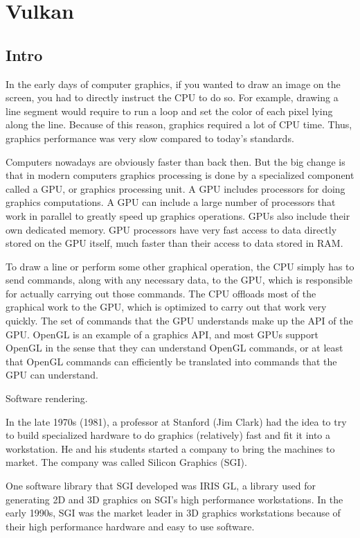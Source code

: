\chapter{Vulkan}

\section{Intro}

In the early days of computer graphics, if you wanted to draw an image on the
screen, you had to directly instruct the CPU to do so.
For example, drawing a line segment would require to run a loop and set the
color of each pixel lying along the line.
Because of this reason, graphics required a lot of CPU time.
Thus, graphics performance was very slow compared to today's standards.

Computers nowadays are obviously faster than back then.
But the big change is that in modern computers graphics processing is done
by a specialized component called a GPU, or graphics processing unit.
A GPU includes processors for doing graphics computations.
A GPU can include a large number of processors that work in parallel
to greatly speed up graphics operations.
GPUs also include their own dedicated memory.
GPU processors have very fast access to data directly stored on the GPU itself,
much faster than their access to data stored in RAM.

To draw a line or perform some other graphical operation, the CPU simply
has to send commands, along with any necessary data, to the GPU, which is
responsible for actually carrying out those commands. The CPU offloads most
of the graphical work to the GPU, which is optimized to carry out that work
very quickly. The set of commands that the GPU understands make up the API
of the GPU. OpenGL is an example of a graphics API, and most GPUs support
OpenGL in the sense that they can understand OpenGL commands, or at least
that OpenGL commands can efficiently be translated into commands that the
GPU can understand.

Software rendering.

In the late 1970s (1981), a professor at Stanford (Jim Clark) had the idea to try
to build specialized hardware to do graphics (relatively) fast and fit it into a
workstation.
He and his students started a company to bring the machines to market. The
company was called Silicon Graphics (SGI).

One software library that SGI developed was IRIS GL,
a library used for generating 2D and 3D graphics on SGI's high performance
workstations.
In the early 1990s, SGI was the market leader in 3D graphics workstations
because of their high performance hardware and easy to use software.


